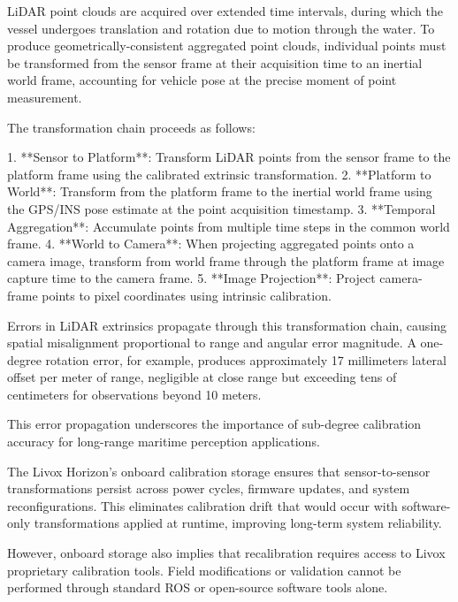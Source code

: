 \documentclass{erauthesis}
\begin{document}
LiDAR point clouds are acquired over extended time intervals, during which the vessel undergoes translation and rotation due to motion through the water.
To produce geometrically-consistent aggregated point clouds, individual points must be transformed from the sensor frame at their acquisition time to an inertial world frame, accounting for vehicle pose at the precise moment of point measurement.

The transformation chain proceeds as follows:

1. **Sensor to Platform**: Transform LiDAR points from the sensor frame to the platform frame using the calibrated extrinsic transformation.
2. **Platform to World**: Transform from the platform frame to the inertial world frame using the GPS/INS pose estimate at the point acquisition timestamp.
3. **Temporal Aggregation**: Accumulate points from multiple time steps in the common world frame.
4. **World to Camera**: When projecting aggregated points onto a camera image, transform from world frame through the platform frame at image capture time to the camera frame.
5. **Image Projection**: Project camera-frame points to pixel coordinates using intrinsic calibration.

Errors in LiDAR extrinsics propagate through this transformation chain, causing spatial misalignment proportional to range and angular error magnitude.
A one-degree rotation error, for example, produces approximately 17 millimeters lateral offset per meter of range, negligible at close range but exceeding tens of centimeters for observations beyond 10 meters.

This error propagation underscores the importance of sub-degree calibration accuracy for long-range maritime perception applications.


The Livox Horizon's onboard calibration storage ensures that sensor-to-sensor transformations persist across power cycles, firmware updates, and system reconfigurations.
This eliminates calibration drift that would occur with software-only transformations applied at runtime, improving long-term system reliability.

However, onboard storage also implies that recalibration requires access to Livox proprietary calibration tools.
Field modifications or validation cannot be performed through standard ROS or open-source software tools alone.

\end{document}
